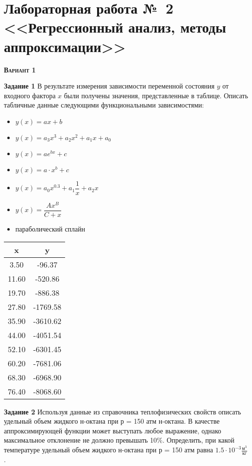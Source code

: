 \section{Лабораторная работа №~2 <<Регрессионный анализ, методы аппроксимации>>}

  \addtocounter{nlab}{1}\textsc{\textbf{Вариант 1}}

\textbf{Задание 1} В результате измерения зависимости переменной состояния $y$ от входного фактора $x$ были получены значения, представленные в таблице. Описать табличные данные следующими функциональными зависимостями:
 \begin{itemize} 
\item $y(x)=a x+b$
\item $y(x)=a_3 x^3 +a_2 x^2 + a_1 x +a_0$
\item $y(x)=a e^{b x}+c  $
\item $y(x)=a \cdot x^b+c$
\item $y(x)=a_0 x^{0.3}               +a_1 \dfrac{1}{x}           +a_2 x                     $
\item $y(x)=\dfrac{A x^B} {C+x}                $
\item параболический сплайн
\end{itemize}
\begin{table}[h]
\begin{tabular}{|c|c|}
\hline
x & y \\ \hline
 3.50 &     -96.37 \\ \hline 
11.60 &    -520.86 \\ \hline 
19.70 &    -886.38 \\ \hline 
27.80 &   -1769.58 \\ \hline 
35.90 &   -3610.62 \\ \hline 
44.00 &   -4051.54 \\ \hline 
52.10 &   -6301.45 \\ \hline 
60.20 &   -7681.06 \\ \hline 
68.30 &   -6968.90 \\ \hline 
76.40 &   -8068.60 \\ \hline 
\end{tabular}
\end{table}

\textbf{Задание 2}  Используя данные из справочника теплофизических свойств описать удельный объем жидкого н-октана при р = 150 атм н-октана. В качестве аппроксимирующей функции может выступать любое выражение, однако максимальное отклонение не должно превышать 10\%. Определить, при какой температуре удельный объем жидкого н-октана при р = 150 атм равна $     1.5 \cdot 10^{-3} \frac{\text{м}^3}{ \text{кг}}$.

